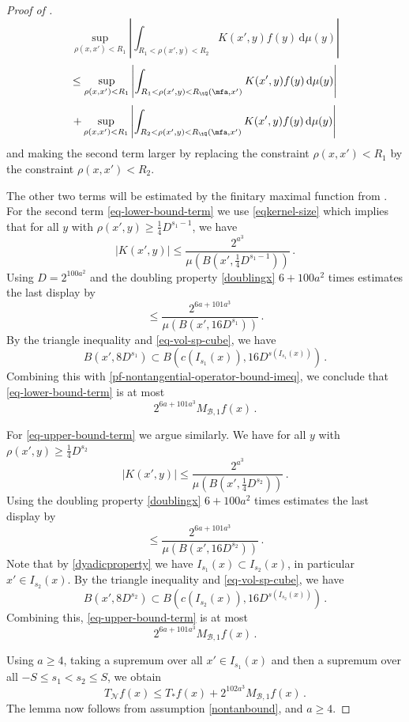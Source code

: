 \begin{proof}[Proof of ]
\begin{equation}
    \sup_{\rho(x,x')<R_1}
        \left|\int_{R_1< \rho(x',y) < R_2} K(x',y) f(y) \, \mathrm{d}\mu(y) \right|
    \end{equation}
    \begin{equation}
    \le \sup_{\rho(x,x')<R_1}
        \left|\int_{R_1< \rho(x',y) < R_{\tQ}(\mfa,x')} K(x',y) f(y) \, \mathrm{d}\mu(y) \right|
    \end{equation}
    \begin{equation}
        + \sup_{\rho(x,x')<R_1}
        \left|\int_{R_2< \rho(x',y) < R_{\tQ}(\mfa,x')} K(x',y) f(y) \, \mathrm{d}\mu(y) \right|
    \end{equation}
    and making the second term larger by replacing the
    constraint $\rho(x,x')<R_1$ by the constraint $\rho(x,x')<R_2$.


    The other two terms will be estimated by the finitary maximal function from .
    For the second term \eqref{eq-lower-bound-term} we use \eqref{eqkernel-size} which implies that for all $y$ with $\rho(x', y) \ge \frac{1}{4}D^{s_1 - 1}$, we have
    $$
        |K(x', y)| \le \frac{2^{a^3}}{\mu(B(x', \frac{1}{4}D^{s_1 - 1}))}\,.
    $$
    Using $D=2^{100a^2}$
    and the doubling property \eqref{doublingx} $6 +100a^2$ times estimates
    the last display by
    \begin{equation}
    \label{pf-nontangential-operator-bound-imeq}
        \le \frac{2^{6a+101a^3}}{\mu(B(x', 16D^{s_1}))}\, .
    \end{equation}
    By the triangle inequality and \eqref{eq-vol-sp-cube}, we have
    $$
        B(x', 8D^{s_1}) \subset B(c(I_{s_1}(x)), 16D^{s(I_{s_1}(x))})\,.
    $$
    Combining this with \eqref{pf-nontangential-operator-bound-imeq}, we conclude that \eqref{eq-lower-bound-term} is at most
    $$
        2^{6a + 101a^3} M_{\mathcal{B},1} f(x)\,.
    $$

    For \eqref{eq-upper-bound-term} we argue similarly. We have for all $y$ with $\rho(x', y) \ge \frac{1}{4}D^{s_2}$
    $$
        |K(x', y)| \le \frac{2^{a^3}}{\mu(B(x', \frac{1}{4}D^{s_2}))}\,.
    $$
    Using the doubling property \eqref{doublingx} $6 + 100a^2$ times estimates
    the last display by
    \begin{equation}
        \le \frac{2^{6a + 101a^3}}{\mu(B(x', 16 D^{s_2}))}\, .
    \end{equation}
    Note that by \eqref{dyadicproperty} we have $I_{s_1}(x) \subset I_{s_2}(x)$, in particular $x' \in I_{s_2}(x)$.
    By the triangle inequality and \eqref{eq-vol-sp-cube}, we have
    $$
        B(x', 8D^{s_2}) \subset B(c(I_{s_2}(x)), 16D^{s(I_{s_2}(x))})\,.
    $$
    Combining this, \eqref{eq-upper-bound-term} is at most
    $$
        2^{6a+101a^3} M_{\mathcal{B},1} f(x)\,.
    $$

    Using $a \ge 4$, taking a supremum over all $x' \in I_{s_1}(x)$ and then a supremum over all $-S \le s_1 < s_2 \le S$, we obtain
    $$
        T_{\mathcal{N}} f(x) \le T_*f(x) + 2^{102a^3} M_{\mathcal{B},1} f(x)\,.
    $$
    The lemma now follows from assumption \eqref{nontanbound},  and $a \ge 4$.
\end{proof}

